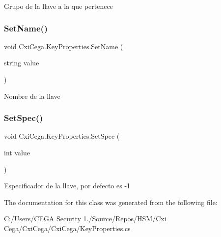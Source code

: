 Grupo de la llave a la que pertenece 

\mbox{\label{class_cxi_cega_1_1_key_properties_ad9b5b54958a9a11eb8a003d38f9b7f8d}} 
\subsubsection{Set\+Name()}
{\footnotesize\ttfamily void Cxi\+Cega.\+Key\+Properties.\+Set\+Name (\begin{DoxyParamCaption}\item[{string}]{value }\end{DoxyParamCaption})}



Nombre de la llave 

\mbox{\label{class_cxi_cega_1_1_key_properties_aa3971d8e3a5f1ae199eb5adb57885801}} 
\subsubsection{Set\+Spec()}
{\footnotesize\ttfamily void Cxi\+Cega.\+Key\+Properties.\+Set\+Spec (\begin{DoxyParamCaption}\item[{int}]{value }\end{DoxyParamCaption})}



Especificador de la llave, por defecto es -\/1 



The documentation for this class was generated from the following file\+:\begin{DoxyCompactItemize}
\item 
C\+:/\+Users/\+C\+E\+G\+A Security 1./\+Source/\+Repos/\+H\+S\+M/\+Cxi Cega/\+Cxi\+Cega/\+Cxi\+Cega/Key\+Properties.\+cs\end{DoxyCompactItemize}
